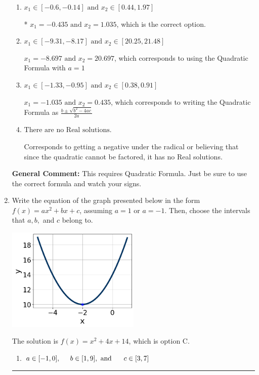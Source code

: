 \documentclass{extbook}[14pt]
\newcommand{\litem}[1]{\item #1

\rule{\textwidth}{0.4pt}}
\begin{document}
\begin{enumerate}
{\begin{enumerate}[label=\Alph*.]
 $x_1 = -29.094 \text{ and } x_2 = 29.694$, which corresponds to writing the Quadratic Formula as $-\frac{b}{2a} \pm \sqrt{b^2 - 4ac}$.
\item \( x_1 \in [-0.6, -0.14] \text{ and } x_2 \in [0.44, 1.97] \)

* $x_1 = -0.435 \text{ and } x_2 = 1.035$, which is the correct option.
\item \( x_1 \in [-9.31, -8.17] \text{ and } x_2 \in [20.25, 21.48] \)

 $x_1 = -8.697 \text{ and } x_2 = 20.697$, which corresponds to using the Quadratic Formula with $a=1$
\item \( x_1 \in [-1.33, -0.95] \text{ and } x_2 \in [0.38, 0.91] \)

 $x_1 = -1.035 \text{ and } x_2 = 0.435$, which corresponds to writing the Quadratic Formula as $\frac{b \pm \sqrt{b^2 - 4ac}}{2a}$
\item \( \text{There are no Real solutions.} \)

Corresponds to getting a negative under the radical or believing that since the quadratic cannot be factored, it has no Real solutions.
\end{enumerate}

\textbf{General Comment:} This requires Quadratic Formula. Just be sure to use the correct formula and watch your signs.
}
\litem{
Write the equation of the graph presented below in the form $f(x)=ax^2+bx+c$, assuming  $a=1$ or $a=-1$. Then, choose the intervals that $a, b,$ and $c$ belong to.

\begin{center}
    \includegraphics[width=0.5\textwidth]{../Figures/quadraticGraphToEquationCopyC.png}
\end{center}




The solution is \( f(x) = x^{2} +4 x + 14 \), which is option C.\begin{enumerate}[label=\Alph*.]
\item \( a \in [-1, 0], \hspace*{5mm} b \in [1, 9], \text{ and } \hspace*{5mm} c \in [3, 7] \)


\end{enumerate}}
\end{enumerate}
\end{document}
